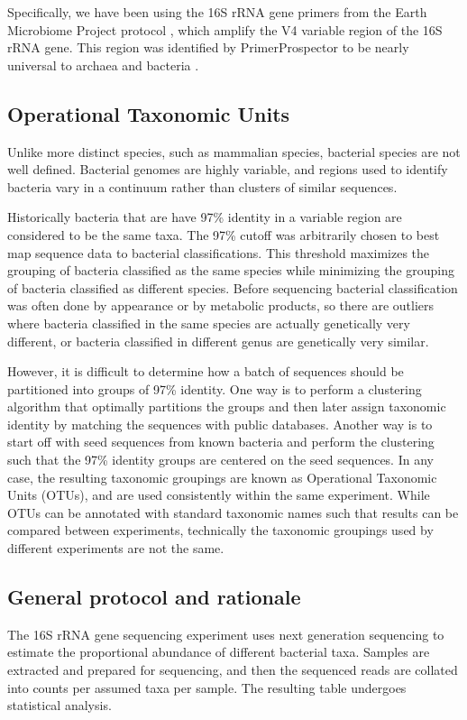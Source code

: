Specifically, we have been using the 16S rRNA gene primers from the Earth Microbiome Project protocol \cite{gilbert2014earth}, which amplify the V4 variable region of the 16S rRNA gene. This region was identified by PrimerProspector to be nearly universal to archaea and bacteria \cite{walters2011primerprospector}.

\subsection{Operational Taxonomic Units}
Unlike more distinct species, such as mammalian species, bacterial species are not well defined. Bacterial genomes are highly variable, and regions used to identify bacteria vary in a continuum rather than clusters of similar sequences.

Historically bacteria that are have 97\% identity in a variable region are considered to be the same taxa. The 97\% cutoff was arbitrarily chosen to best map sequence data to bacterial classifications. This threshold maximizes the grouping of bacteria classified as the same species while minimizing the grouping of bacteria classified as different species. Before sequencing bacterial classification was often done by appearance or by metabolic products, so there are outliers where bacteria classified in the same species are actually genetically very different, or bacteria classified in different genus are genetically very similar.

However, it is difficult to determine how a batch of sequences should be partitioned into groups of 97\% identity. One way is to perform a clustering algorithm that optimally partitions the groups and then later assign taxonomic identity by matching the sequences with public databases. Another way is to start off with seed sequences from known bacteria and perform the clustering such that the 97\% identity groups are centered on the seed sequences. In any case, the resulting taxonomic groupings are known as Operational Taxonomic Units (OTUs), and are used consistently within the same experiment. While OTUs can be annotated with standard taxonomic names such that results can be compared between experiments, technically the taxonomic groupings used by different experiments are not the same.

\subsection{General protocol and rationale}
The 16S rRNA gene sequencing experiment uses next generation sequencing to estimate the proportional abundance of different bacterial taxa. Samples are extracted and prepared for sequencing, and then the sequenced reads are collated into counts per assumed taxa per sample. The resulting table undergoes statistical analysis.

